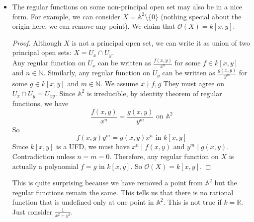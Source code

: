 \documentclass[15pt]{scrartcl}
\newcommand{\R}{\mathbb{R}}
\newcommand{\A}{\mathbb{A}}
\newcommand{\cO}{\mathcal{O}}
\begin{document}
\begin{itemize}
\begin{proof}
    \end{proof}
    \begin{remark}
        A key property about fraction is used here. If $\frac{a}{b}=\frac{c}{d}$, then $\frac{a}{b}=\frac{c}{d}=\frac{a+c}{b+d}$.
    \end{remark}
    \begin{remark}
    Let $f=1$. Then $U_f=X$. So we have $\mathcal{O}(X)=\{\frac{g}{1^n}\mid g\in \mathcal{O}(X), n\in \mathbb{N}\}=\mathcal{O}(X)$. This shows that the two different definitions of $\mathcal{O}(X)$ are indeed the same. 
    \end{remark}
    \begin{remark}
        This is clearly similar to localization of of $\cO(X)$ at the multiplicative set generated by $f$. In fact, they are isomorphic. Proof is easy. And this is where the notion of localization comes from geometrically.
    \end{remark}
    \item The regular functions on some non-principal open set may also be in a nice form. For example, we can consider $X=\A^2\setminus\{0\}$ (nothing special about the origin here, we can remove any point). We claim that $\cO(X)=k[x,y]$. 
    \begin{proof}
        Although $X$ is not a principal open set, we can write it as union of two principal open sets: $X=U_x\cap U_y$. 
        \\

        Any regular function on $U_x$ can be written as $\frac{f(x,y)}{x^n}$ for some $f\in k[x,y]$ and $n\in \mathbb{N}$. Similarly, any regular function on $U_y$ can be written as $\frac{g(x,y)}{y^m}$ for some $g\in k[x,y]$ and $m\in \mathbb{N}$. We assume $x\nmid f,g$ They must agree on $U_x\cap U_y=U_{xy}$. Since $\A^2$ is irreducible, by identity theorem of regular functions, we have
        \[\frac{f(x,y)}{x^n}=\frac{g(x,y)}{y^m} \text{ on } \A^2\]
        So \[f(x,y)y^m=g(x,y)x^n \text{ in } k[x,y]\]
        Since $k[x,y]$ is a UFD, we must have $x^n\mid f(x,y)$ and $y^m\mid g(x,y)$. Contradiction unless $n=m=0$. Therefore, any regular function on $X$ is actually a polynomial $f=g$ in $k[x,y]$. So $\cO(X)=k[x,y]$.
    \end{proof}
    \begin{remark}
        This is quite surprising because we have removed a point from $\A^2$ but the regular functions remain the same. This tells us that there is no rational function that is undefined only at one point in $\A^2$. This is not true if $k=\R$. Just consider $\frac{1}{x^2+y^2}$.
    \end{remark}
\end{itemize}
\newpage
\end{document}
